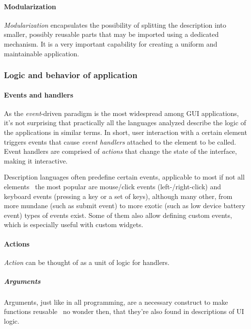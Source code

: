 \paragraph{Modularization}
\emph{Modularization} encapsulates the possibility of splitting the description into smaller, possibly reusable parts that may be imported using a dedicated mechanism.
It is a very important capability for creating a uniform and maintainable application.

\subsubsection{Logic and behavior of application}

\paragraph{Events and handlers}
As the \emph{event}-driven paradigm is the most widespread among GUI applications, it's not surprising that practically all the languages analyzed describe the logic of the applications in similar terms.
In short, user interaction with a certain element triggers events that cause \emph{event handlers} attached to the element to be called.
Event handlers are comprised of \emph{actions} that change the state of the interface, making it interactive.

Description languages often predefine certain events, applicable to most if not all elements \textendash\ the most popular are mouse/click events (left-/right-click) and keyboard events (pressing a key or a set of keys), although many other, from more mundane (such as submit event) to more exotic (such as low device battery event) types of events exist.
Some of them also allow defining custom events, which is especially useful with custom widgets.

\paragraph{Actions}
\emph{Action} can be thought of as a unit of logic for handlers.


\subparagraph{Arguments}
Arguments, just like in all programming, are a necessary construct to make functions reusable \textendash\ no wonder then, that they're also found in descriptions of UI logic.

